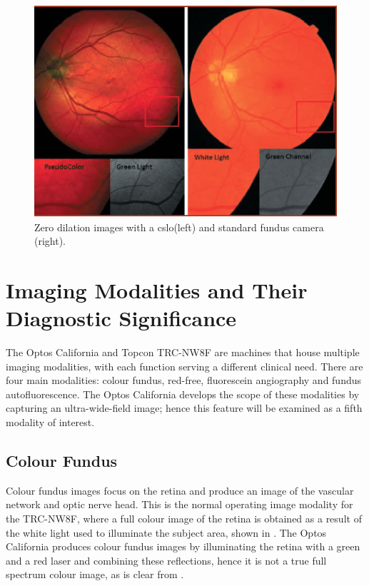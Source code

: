 \begin{figure}[H]
\centering
\includegraphics{figures/zerodilation}
\caption{Zero dilation images with a \gls{cslo}(left) and standard fundus camera (right).\cite{11_de_brouwere_2013}}
\label{fig:zero}
   \end{figure}


\section{Imaging Modalities and Their Diagnostic Significance}

The Optos California and Topcon TRC-NW8F are machines that house
multiple imaging modalities, with each function serving a different clinical
need. There are four main modalities: colour fundus, red-free, fluorescein angiography and fundus autofluorescence. The Optos California develops
the scope of these modalities by capturing an ultra-wide-field image;
hence this feature will be examined as a fifth modality of interest.


\subsection{Colour Fundus}

Colour fundus images focus on the retina and produce an image of the vascular
network and optic nerve head. This is the normal operating image modality for
the TRC-NW8F, where a full colour image of the retina is obtained as a result
of the white light used to illuminate the subject area, shown in .
The Optos California produces colour fundus images by illuminating the retina
with a green and a red \gls{laser} and combining these reflections, hence it is not
a true full spectrum colour image, as is clear from .


